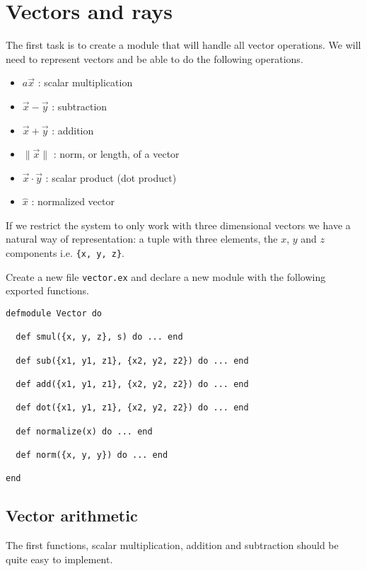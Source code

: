 \documentclass[a4paper,11pt]{article}
\begin{document}

\section{Vectors and rays}

The first task is to create a module that will handle all vector
operations. We will need to represent vectors and be able to do the
following operations.

\begin{itemize}
 \item $a\vec{x}$ : scalar multiplication
 \item $\vec{x} - \vec{y}$ : subtraction
 \item $\vec{x} + \vec{y}$ : addition
 \item $\|\vec{x}\|$ : norm, or length, of a vector
 \item $\vec{x} \cdot \vec{y}$ : scalar product (dot product)
 \item $\hat{x}$ : normalized vector
\end{itemize}

If we restrict the system to only work with three dimensional vectors
we have a natural way of representation: a tuple with three elements,
the $x$, $y$ and $z$ components i.e. {\tt \{x, y, z\}}. 

Create a new file {\tt vector.ex} and declare a new module with the
following exported functions.

\begin{verbatim}
defmodule Vector do

  def smul({x, y, z}, s) do ... end

  def sub({x1, y1, z1}, {x2, y2, z2}) do ... end

  def add({x1, y1, z1}, {x2, y2, z2}) do ... end

  def dot({x1, y1, z1}, {x2, y2, z2}) do ... end  

  def normalize(x) do ... end

  def norm({x, y, y}) do ... end

end
\end{verbatim}

\subsection*{Vector arithmetic}

The first functions, scalar multiplication, addition and subtraction
should be quite easy to implement.
\end{document}
